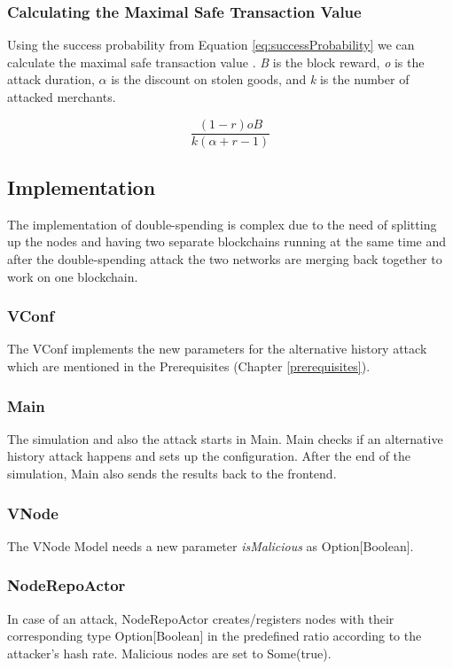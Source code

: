\subsubsection{Calculating the Maximal Safe Transaction Value \label{subsubsection:CalculatingTheMaximalSafeTransactionValue}}
Using the success probability from Equation \eqref{eq:successProbability} we can calculate the maximal safe transaction value \cite{doublespending}. \textit{B} is the block reward, \textit{o} is the attack duration, \textit{$\alpha$} is the discount on stolen goods, and \textit{k} is the number of attacked merchants.

\begin{equation}\label{eq:maximalSafeTransactionValue}
\dfrac{(1 - r) oB}{ k (\alpha + r - 1)}
\end{equation}

\subsection{Implementation}
The implementation of double-spending is complex due to the need of splitting up the nodes and having two separate blockchains running at the same time and after the double-spending attack the two networks are merging back together to work on one blockchain.

\subsubsection{VConf}
The VConf implements the new parameters for the alternative history attack which are mentioned in the Prerequisites (Chapter \ref{prerequisites}).

\subsubsection{Main}
The simulation and also the attack starts in Main. Main checks if an alternative history attack happens and sets up the configuration. After the end of the simulation, Main also sends the results back to the frontend.

\subsubsection{VNode}
The VNode Model needs a new parameter \textit{isMalicious} as Option[Boolean].

\subsubsection{NodeRepoActor}
In case of an attack, NodeRepoActor creates/registers nodes with their corresponding type Option[Boolean] in the predefined ratio according to the attacker's hash rate. Malicious nodes are set to Some(true).

